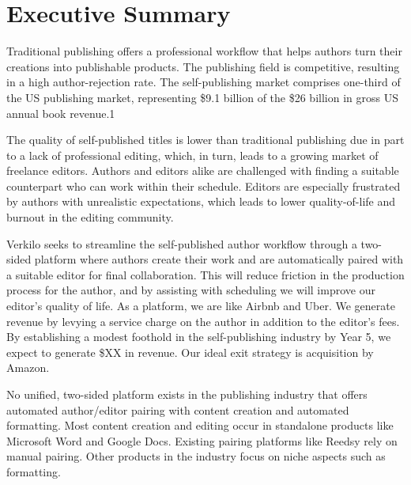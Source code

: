 \documentclass[10pt,openany]{book}
\begin{document}
      \listoftables
  
      \listoffigures
  
\newpage %

\pagestyle{fancy}
\hypertarget{executive-summary}{%
\chapter{Executive Summary}\label{executive-summary}}

Traditional publishing offers a professional workflow that helps authors
turn their creations into publishable products. The publishing field is
competitive, resulting in a high author-rejection rate. The
self-publishing market comprises one-third of the US publishing market,
representing \$9.1 billion of the \$26 billion in gross US annual book
revenue.1

The quality of self-published titles is lower than traditional
publishing due in part to a lack of professional editing, which, in
turn, leads to a growing market of freelance editors. Authors and
editors alike are challenged with finding a suitable counterpart who can
work within their schedule. Editors are especially frustrated by authors
with unrealistic expectations, which leads to lower quality-of-life and
burnout in the editing community.

Verkilo seeks to streamline the self-published author workflow through a
two-sided platform where authors create their work and are automatically
paired with a suitable editor for final collaboration. This will reduce
friction in the production process for the author, and by assisting with
scheduling we will improve our editor's quality of life. As a platform,
we are like Airbnb and Uber. We generate revenue by levying a service
charge on the author in addition to the editor's fees. By establishing a
modest foothold in the self-publishing industry by Year 5, we expect to
generate \$XX in revenue. Our ideal exit strategy is acquisition by
Amazon.

No unified, two-sided platform exists in the publishing industry that
offers automated author/editor pairing with content creation and
automated formatting. Most content creation and editing occur in
standalone products like Microsoft Word and Google Docs. Existing
pairing platforms like Reedsy rely on manual pairing. Other products in
the industry focus on niche aspects such as formatting.
\end{document}
